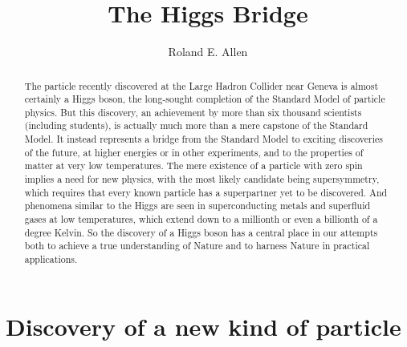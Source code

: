 \documentclass[12pt]{iopart}
\begin{document}
\title{The Higgs Bridge}

\author{Roland E. Allen}
\address{Department of Physics and Astronomy \\ 
Texas A\&M University, College Station, Texas 77843, USA}

\begin{abstract}
The particle recently discovered at the Large Hadron Collider near Geneva is almost certainly a Higgs boson, the long-sought completion of the Standard Model of particle physics. But this discovery, an achievement by more than six thousand scientists (including students), is actually much more than a mere capstone of the Standard Model. It instead represents a bridge from the Standard Model to exciting discoveries of the future, at higher energies or in other experiments, and to the properties of matter at very low temperatures. The mere existence of a particle with zero spin implies a need for new physics, with the most likely candidate being supersymmetry, which requires that every known particle has a superpartner yet to be discovered. And phenomena similar to the Higgs are seen in superconducting metals and superfluid gases at low temperatures, which extend down to a millionth or even a billionth of a degree Kelvin. So the discovery of a Higgs boson has a central place in our attempts both to achieve a true understanding of Nature and to harness Nature in practical applications.
\end{abstract}

\maketitle

\section{\label{sec:sec1} Discovery of a new kind of particle}
\end{document}
